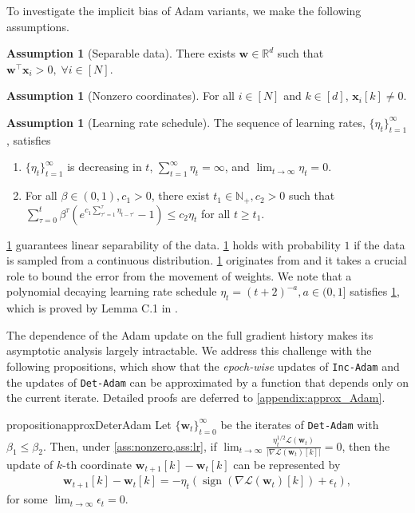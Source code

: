 \documentclass{article} %
\theoremstyle{plain}
\theoremstyle{definition}
\newtheorem{assumption}[theorem]{Assumption}
\theoremstyle{remark}
\def\bigopen#1{\left(#1\right)}
\def\sN{{\mathbb{N}}}
\newcommand{\Ls}{\mathcal{L}}
\newcommand{\R}{\mathbb{R}}
\DeclareMathOperator{\sign}{sign}
\def\bx{{\mathbf x}}
\def\bw{{\mathbf w}}
\begin{document}
To investigate the implicit bias of Adam variants, we make the following assumptions.

\begin{assumption}[Separable data]\label{ass:linsep}
    There exists $\bw\in\R^d$ such that $\bw^\top\bx_i>0, \; \forall i\in[N]$.
\end{assumption}

\begin{assumption}[Nonzero coordinates]\label{ass:nonzero}
    For all $i \in [N]$ and $k \in [d]$, $\bx_i[k] \neq 0$.
\end{assumption}

\begin{assumption}[Learning rate schedule]\label{ass:lr}
The sequence of learning rates, $\{\eta_t\}_{t=1}^\infty$, satisfies
\begin{enumerate}[label=(\alph*)]
    \item $\{\eta_t\}_{t=1}^\infty$ is decreasing in $t$, $\sum_{t=1}^\infty \eta_t = \infty$, and $\lim_{t \rightarrow \infty} \eta_t = 0$.
    \item For all $\beta \in (0,1), c_1>0$, there exist $t_1 \in \sN_+, c_2 > 0$ such that $\sum_{\tau=0}^t\beta^\tau(e^{c_1\sum_{\tau'=1}^\tau \eta_{t - \tau'}}-1) \leq c_2 \eta_t$ for all $t \geq t_1$.
\end{enumerate}
\end{assumption}


\cref{ass:linsep} guarantees linear separability of the data. \cref{ass:nonzero} holds with probability $1$ if the data is sampled from a continuous distribution. \cref{ass:lr} originates from \citet{zhang2024the} and it takes a crucial role to bound the error from the movement of weights. We note that a polynomial decaying learning rate schedule $\eta_t = (t+2)^{-a}, a \in (0, 1]$ satisfies \cref{ass:lr}, which is proved by Lemma C.1 in \citet{zhang2024the}.

The dependence of the Adam update on the full gradient history makes its asymptotic analysis largely intractable. We address this challenge with the following propositions, which show that the \textit{epoch-wise} updates of \texttt{Inc-Adam} and the updates of \texttt{Det-Adam} can be approximated by a function that depends only on the current iterate. Detailed proofs are deferred to \cref{appendix:approx_Adam}.


\begin{restatable}{proposition}{approxDeterAdam}\label{prop:approxDeterAdam}
    Let $\{\bw_t\}_{t=0}^\infty$ be the iterates of \textnormal{\texttt{Det-Adam}} with $\beta_1 \leq \beta_2$. Then, under \cref{ass:nonzero,ass:lr}, if $\lim_{t\rightarrow\infty}\frac{\eta_t^{1/2}\Ls(\bw_t)}{|\nabla\Ls(\bw_t)[k]|}=0$, then the update of $k$-th coordinate $\bw_{t+1}[k]-\bw_t[k]$ can be represented by
    \begin{align}
        \bw_{t+1}[k]-\bw_t[k]=-\eta_t \bigopen{\sign(\nabla \Ls(\bw_t)[k])+\epsilon_t},
    \end{align}
    for some $\lim_{t\rightarrow\infty} \epsilon_t=0$.
\end{restatable}
\end{document}
